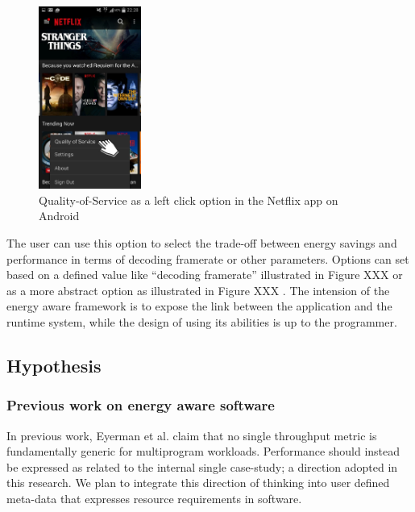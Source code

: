 \documentclass{article}
\begin{document}
\begin{figure}
  \begin{center}
    \includegraphics[width=0.3\textwidth]{fig/netflix.png}
  \end{center}
  \caption{Quality-of-Service as a left click option in the Netflix app on Android}
  \label{fig:netflix}
  \vspace{-2cm}
\end{figure}
The user can use this option to select the trade-off between energy savings and performance in terms of decoding framerate or other parameters. 
Options can set based on a defined value like ``decoding framerate'' illustrated in Figure XXX  or as a more abstract option as illustrated in Figure XXX . 
The intension of the energy aware framework is to expose the link between the application and the runtime system, while the design of using its abilities is up to the programmer.

\subsection{Hypothesis}

\subsubsection{Previous work on energy aware software}
In previous work, Eyerman et al. \cite{Eyerman:09} claim that no single throughput metric is fundamentally generic for multiprogram workloads. 
Performance should instead be expressed as related to the internal single case-study; a direction adopted in this research. 
We plan to integrate this direction of thinking into user defined meta-data that expresses resource requirements in software.
\end{document}
